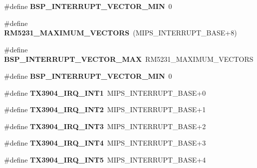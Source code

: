 \begin{DoxyCompactItemize}
\#define {\bfseries B\+S\+P\+\_\+\+I\+N\+T\+E\+R\+R\+U\+P\+T\+\_\+\+V\+E\+C\+T\+O\+R\+\_\+\+M\+IN}~0
\item 
\mbox{\label{group__bsp__interrupt_ga819322cc6f9b779cb35b24ea3816d435}} 
\#define {\bfseries R\+M5231\+\_\+\+M\+A\+X\+I\+M\+U\+M\+\_\+\+V\+E\+C\+T\+O\+RS}~(M\+I\+P\+S\+\_\+\+I\+N\+T\+E\+R\+R\+U\+P\+T\+\_\+\+B\+A\+SE+8)
\item 
\mbox{\label{group__bsp__interrupt_gae4a2cdda5816a4c83c2fac0a49880c6e}} 
\#define {\bfseries B\+S\+P\+\_\+\+I\+N\+T\+E\+R\+R\+U\+P\+T\+\_\+\+V\+E\+C\+T\+O\+R\+\_\+\+M\+AX}~R\+M5231\+\_\+\+M\+A\+X\+I\+M\+U\+M\+\_\+\+V\+E\+C\+T\+O\+RS
\item 
\mbox{\label{group__bsp__interrupt_ga64cbb02dfea4d6923abccaa0087d2a0d}} 
\#define {\bfseries B\+S\+P\+\_\+\+I\+N\+T\+E\+R\+R\+U\+P\+T\+\_\+\+V\+E\+C\+T\+O\+R\+\_\+\+M\+IN}~0
\item 
\mbox{\label{group__bsp__interrupt_ga96c5f612f9d072c56c1b2d6ee4cddb4c}} 
\#define {\bfseries T\+X3904\+\_\+\+I\+R\+Q\+\_\+\+I\+N\+T1}~M\+I\+P\+S\+\_\+\+I\+N\+T\+E\+R\+R\+U\+P\+T\+\_\+\+B\+A\+SE+0
\item 
\mbox{\label{group__bsp__interrupt_ga7bf2c06dc049e28e3dab764c5c66aeae}} 
\#define {\bfseries T\+X3904\+\_\+\+I\+R\+Q\+\_\+\+I\+N\+T2}~M\+I\+P\+S\+\_\+\+I\+N\+T\+E\+R\+R\+U\+P\+T\+\_\+\+B\+A\+SE+1
\item 
\mbox{\label{group__bsp__interrupt_ga6e3195cd475ef57fc30a3b3c966e8f3d}} 
\#define {\bfseries T\+X3904\+\_\+\+I\+R\+Q\+\_\+\+I\+N\+T3}~M\+I\+P\+S\+\_\+\+I\+N\+T\+E\+R\+R\+U\+P\+T\+\_\+\+B\+A\+SE+2
\item 
\mbox{\label{group__bsp__interrupt_gaf9603eef4900ce87b109d26815450eb8}} 
\#define {\bfseries T\+X3904\+\_\+\+I\+R\+Q\+\_\+\+I\+N\+T4}~M\+I\+P\+S\+\_\+\+I\+N\+T\+E\+R\+R\+U\+P\+T\+\_\+\+B\+A\+SE+3
\item 
\mbox{\label{group__bsp__interrupt_ga7cc2f7a7f395db793cebaedf258f7614}} 
\#define {\bfseries T\+X3904\+\_\+\+I\+R\+Q\+\_\+\+I\+N\+T5}~M\+I\+P\+S\+\_\+\+I\+N\+T\+E\+R\+R\+U\+P\+T\+\_\+\+B\+A\+SE+4

\end{DoxyCompactItemize}
